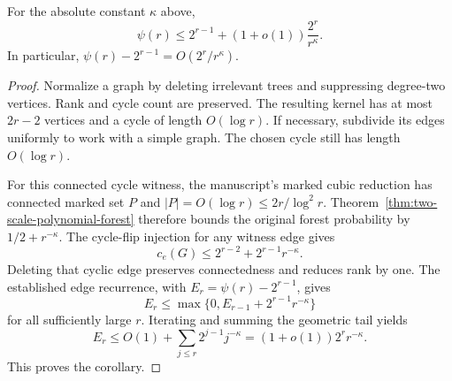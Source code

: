 \begin{corollary}
\label{cor:two-scale-polynomial-cycles}
For the absolute constant $\kappa$ above,
\[
 \psi(r)\le2^{r-1}+(1+o(1))\frac{2^r}{r^\kappa}.
\]
In particular, $\psi(r)-2^{r-1}=O(2^r/r^\kappa)$.
\end{corollary}

\begin{proof}
Normalize a graph by deleting irrelevant trees and suppressing degree-two vertices.
Rank and cycle count are preserved.
The resulting kernel has at most $2r-2$ vertices and a cycle of length $O(\log r)$.
If necessary, subdivide its edges uniformly to work with a simple graph.
The chosen cycle still has length $O(\log r)$.

For this connected cycle witness, the manuscript's marked cubic reduction has connected marked set $P$ and
$|P|=O(\log r)\le2r/\log^2r$.
Theorem~\ref{thm:two-scale-polynomial-forest} therefore bounds the original forest probability by $1/2+r^{-\kappa}$.
The cycle-flip injection for any witness edge gives
\[
 c_e(G)\le2^{r-2}+2^{r-1}r^{-\kappa}.
\]
Deleting that cyclic edge preserves connectedness and reduces rank by one.
The established edge recurrence, with $E_r=\psi(r)-2^{r-1}$, gives
\[
 E_r\le\max\{0,E_{r-1}+2^{r-1}r^{-\kappa}\}
\]
for all sufficiently large $r$.
Iterating and summing the geometric tail yields
\[
 E_r\le O(1)+\sum_{j\le r}2^{j-1}j^{-\kappa}
      =(1+o(1))2^r r^{-\kappa}.
\]
This proves the corollary.
\end{proof}
